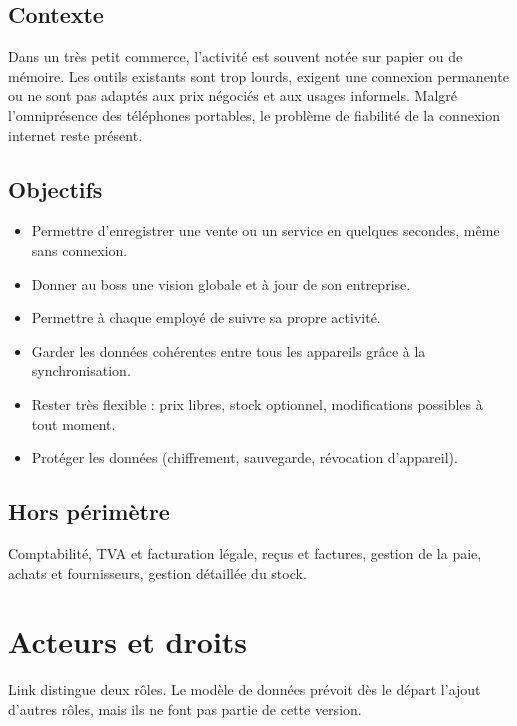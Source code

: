 \documentclass[11pt,a4paper]{article}
\begin{document}
	\subsection{Contexte}
	Dans un très petit commerce, l'activité est souvent notée sur papier ou de mémoire. Les outils existants sont trop lourds, exigent une connexion permanente ou ne sont pas adaptés aux prix négociés et aux usages informels. Malgré l'omniprésence des téléphones portables, le problème de fiabilité de la connexion internet reste présent.
	
	\subsection{Objectifs}
	\begin{itemize}[leftmargin=*]
		\item Permettre d'enregistrer une vente ou un service en quelques secondes, même sans connexion.
		\item Donner au boss une vision globale et à jour de son entreprise.
		\item Permettre à chaque employé de suivre sa propre activité.
		\item Garder les données cohérentes entre tous les appareils grâce à la synchronisation.
		\item Rester très flexible : prix libres, stock optionnel, modifications possibles à tout moment.
		\item Protéger les données (chiffrement, sauvegarde, révocation d'appareil).
	\end{itemize}
	
	\subsection{Hors périmètre}
	Comptabilité, TVA et facturation légale, reçus et factures, gestion de la paie, achats et fournisseurs, gestion détaillée du stock.
	
	\section{Acteurs et droits}
	Link distingue deux rôles. Le modèle de données prévoit dès le départ l'ajout d'autres rôles, mais ils ne font pas partie de cette version.
	
\end{document}
